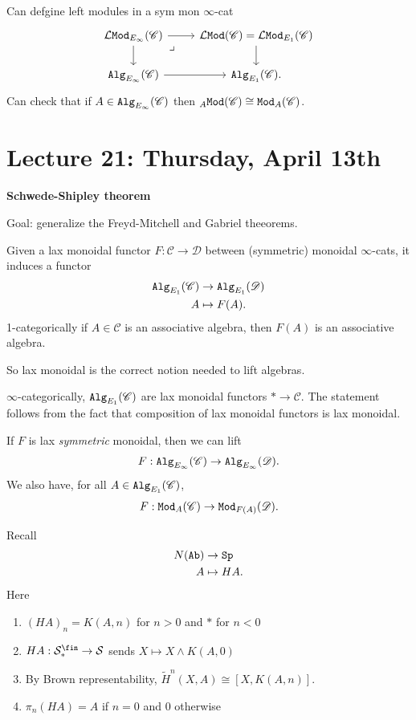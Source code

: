 \documentclass[12pt]{amsart}
\let\til\widetilde
\theoremstyle{definition}
\let\smashprod\wedge
\providecommand{\Sp}{\texttt{Sp}}
\providecommand{\Sp}{\text{Sp}}
\providecommand{\LMod}{\mathcal{L}\Mod}
\begin{document}
Can defgine left modules in a sym mon $\infty$-cat
\[ \begin{tikzcd}
    \LMod_{E_\infty}(\mathscr{C})\rar\dar\pb & \LMod(\mathscr{C}) = \LMod_{E_1}(\mathscr{C})\dar\\
    \Alg_{E_\infty}(\mathscr{C})\rar & \Alg_{E_1}(\mathscr{C}).
\end{tikzcd} \]
Can check that if $A\in \texttt{Alg}_{E_\infty}(\mathscr{C})$ then ${}_A\texttt{Mod}(\mathscr{C}) \cong \texttt{Mod}_A(\mathscr{C})$.



\section{Lecture 21: Thursday, April 13th}

\begin{center}
    \textbf{Schwede-Shipley theorem}
\end{center}

Goal: generalize the Freyd-Mitchell and Gabriel theeorems.

Given a lax monoidal functor $F: \mathscr{C} \to \mathscr{D}$ between (symmetric) monoidal $\infty$-cats, it induces a functor
\begin{align*}
    \texttt{Alg}_{E_1}(\mathscr{C}) &\to \texttt{Alg}_{E_1}(\mathscr{D}) \\
    A &\mapsto F(A).
\end{align*}
1-categorically if $A\in \mathscr{C}$ is an associative algebra, then $F(A)$ is an associative algebra.

So lax monoidal is the correct notion needed to lift algebras.

$\infty$-categorically, $\texttt{Alg}_{E_1}(\mathscr{C})$ are lax monoidal functors $\ast \to \mathscr{C}$. The statement follows from the fact that composition of lax monoidal functors is lax monoidal.

If $F$ is lax \textit{symmetric} monoidal, then we can lift
\begin{align*}
    F: \texttt{Alg}_{E_\infty}(\mathscr{C}) \to \texttt{Alg}_{E_\infty}(\mathscr{D}).
\end{align*}
We also have, for all $A\in \texttt{Alg}_{E_1}(\mathscr{C})$,
\begin{align*}
    F: \texttt{Mod}_A(\mathscr{C}) \to \texttt{Mod}_{F(A)}(\mathscr{D}).
\end{align*}

Recall
\begin{align*}
    N(\Ab) &\to \Sp \\
    A &\mapsto HA.
\end{align*}
Here
\begin{enumerate}
    \item $(HA)_n = K(A,n)$ for $n>0$ and $\ast$ for $n<0$
    \item $HA : \mathcal{S}_\ast^\fin \to \mathcal{S}$ sends $X \mapsto X \smashprod K(A,0)$
    \item By Brown representability, $\til{H}^n(X,A) \cong \left[ X,K(A,n) \right]$.
    \item $\pi_n(HA) = A$ if $n=0$ and $0$ otherwise
\end{enumerate}
\end{document}
